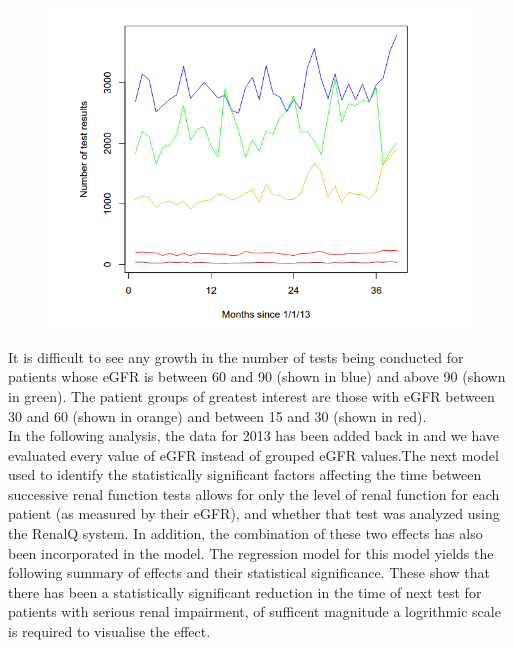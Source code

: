 \documentclass[11pt]{article}
\begin{document}
\begin{figure}[htp]
\centering
\includegraphics[scale=0.50]{fig6.png}
\caption{}
\label{}
\end{figure}

It is difficult to see any growth in the number of tests being conducted for patients whose eGFR is between 60 and 90 (shown in blue) and above 90 (shown in green). The patient groups of greatest interest are those with eGFR between 30 and 60 (shown in orange) and between 15 and 30 (shown in red).\\

In the following analysis, the data for 2013 has been added back in and we have evaluated every value of eGFR instead of grouped eGFR values.The next  model  used to identify the statistically significant factors affecting the time between successive renal function tests allows for only the level of renal function for each patient (as measured by their eGFR), and whether that test was analyzed using the RenalQ system. In addition, the combination of these two effects has also been incorporated in the model. The regression model for this model yields  the following summary of effects and their statistical significance. These show that there has been a statistically significant reduction in the time of next test for patients with serious renal impairment, of sufficent magnitude a logrithmic scale is required to visualise the effect.\\
\end{document}
